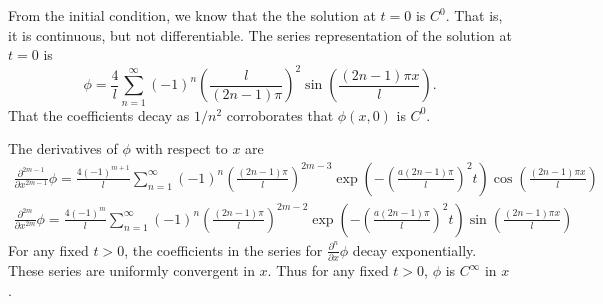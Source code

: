 {\begin{Solution}
  From the initial condition, we know that the
  the solution at $t = 0$ is $C^0$.  That is, it is continuous, but not 
  differentiable.  The series representation of the solution at $t = 0$ is
  \[
  \phi = \frac{4}{l}\sum_{n=1}^\infty (-1)^n \left( \frac{l}{(2n-1) \pi} \right)^2
  \sin \left( \frac{(2n-1) \pi x}{l} \right).
  \]
  That the coefficients decay as $1/n^2$ corroborates that $\phi(x,0)$ 
  is $C^0$.

  The derivatives of $\phi$ with respect to $x$ are
  \begin{gather*}
    \frac{\partial^{2m-1}}{\partial x^{2m-1}}\phi 
    = \frac{4(-1)^{m+1}}{l} \sum_{n=1}^\infty (-1)^n \left( \frac{(2n-1) \pi}{l}
    \right)^{2m-3}
    \exp \left( - \left( \frac{a (2n-1) \pi}{l} \right)^2 t \right)
    \cos \left( \frac{(2n-1) \pi x}{l} \right) \\
    \frac{\partial^{2m}}{\partial x^{2m}}\phi 
    = \frac{4 (-1)^m}{l} \sum_{n=1}^\infty (-1)^n \left( \frac{(2n-1) \pi}{l}
    \right)^{2m-2}
    \exp \left( - \left( \frac{a (2n-1) \pi}{l} \right)^2 t \right)
    \sin \left( \frac{(2n-1) \pi x}{l} \right)
  \end{gather*}
  For any fixed $t > 0$, the coefficients in the series for 
  $\frac{\partial^n}{\partial x} \phi$ decay exponentially.  These series are
  uniformly convergent in $x$.  Thus for any fixed $t > 0$, $\phi$ is 
  $C^\infty$ in $x$. 
\end{Solution}









}
